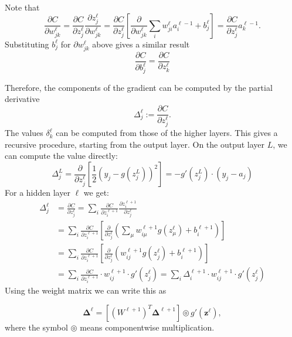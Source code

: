 \documentclass{article}
\newcommand{\vc}[1]{\boldsymbol{#1}}
\begin{document}
    Note that
    \[
        \frac{\partial C}{\partial w_{jk}^\ell} = 
        \frac{\partial C}{\partial z_j^\ell} 
        \frac{\partial z_j^\ell}{\partial w_{jk}^\ell} =
        \frac{\partial C}{\partial z_j^\ell} 
        \left[ \frac{\partial}{\partial w_{jk}^\ell} \sum_i w_{ji}^\ell a_{i}^{\ell-1} + b_j^\ell \right] = 
        \frac{\partial C}{\partial z_j^\ell} a_{k}^{\ell-1}.
    \]
    Substituting $b_j^\ell$ for $\partial w_{jk}^\ell$ above gives a similar result
    \[
        \frac{\partial C}{\partial b_{j}^\ell} = \frac{\partial C}{\partial z_k^\ell}
    \]

    Therefore, the components of the gradient can be computed by the partial derivative
    \[
        \Delta_j^\ell := \frac{\partial C}{\partial z_j^\ell}.   
    \]
    The values $\delta_k^\ell$ can be computed from those of the higher layers. 
    This gives a recursive procedure, starting from the output layer. 
    On the output layer $L$, we can compute the value directly:
    \[
       \Delta_j^L = \frac{\partial}{\partial z_j^\ell} 
       \left[\frac12 \left(y_j - g(z_j^L)\right)^2 \right] = 
       -g'(z_j^L) \cdot (y_j - a_j)
    \]
    For a hidden layer $\ell$ we get: 
    \begin{align*}
        \Delta_j^\ell &= \frac{\partial C}{\partial z_j^\ell} =
        \sum_i
        \frac{\partial C}{\partial z_i^{\ell+1}}
        \frac{\partial z_i^{\ell+1}}{\partial z_j^\ell} \\
        &= \sum_{i} 
        \frac{\partial C}{\partial z_i^{\ell+1}} \left[
        \frac{\partial}{\partial z_j^\ell} \left(\sum_\mu w_{i \mu}^{\ell+1} 
        g(z_\mu^\ell) + b_i^{\ell+1}\right) \right]\\
        &= \sum_{i} 
        \frac{\partial C}{\partial z_i^{\ell+1}} \left[
        \frac{\partial}{\partial z_j^\ell} \left(w_{i j}^{\ell+1} g(z_j^\ell) 
        + b_i^{\ell+1}
        \right) \right]\\
        &= \sum_{i} 
        \frac{\partial C}{\partial z_i^{\ell+1}}
        \cdot w_{i j}^{\ell+1} \cdot g'(z_j^\ell)
        = \sum_{i} 
        \Delta_i^{\ell+1}
        \cdot w_{i j}^{\ell+1} \cdot g'(z_j^\ell)
    \end{align*}
    Using the weight matrix we can write this as 

    \begin{equation}
        \vc\Delta^\ell = \left[ (W^{\ell +1})^T \vc\Delta^{\ell +1} \right] \circledcirc g'(\vc z^\ell), 
    \end{equation}
    where the symbol $\circledcirc$ means componentwise multiplication.
\end{document}
